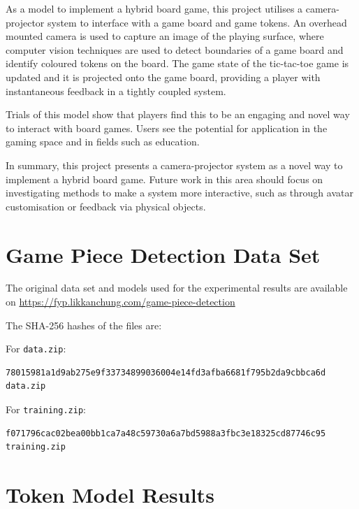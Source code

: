 \documentclass[12pt]{article}
\begin{document}
As a model to implement a hybrid board game, this project utilises a camera-projector system to interface with a game board and game tokens. 
An overhead mounted camera is used to capture an image of the playing surface, where computer vision techniques are used to detect boundaries of a game board and identify coloured tokens on the board. 
The game state of the tic-tac-toe game is updated and it is projected onto the game board, providing a player with instantaneous feedback in a tightly coupled system.

Trials of this model show that players find this to be an engaging and novel way to interact with board games. 
Users see the potential for application in the gaming space and in fields such as education. 

In summary, this project presents a camera-projector system as a novel way to implement a hybrid board game. 
Future work in this area should focus on investigating methods to make a system more interactive, such as through avatar customisation or feedback via physical objects.


\appendix
\section{Game Piece Detection Data Set}
\label{app:data}
\noindent
The original data set and models used for the experimental results are available on 
\url{https://fyp.likkanchung.com/game-piece-detection}

\vspace{2em}
\noindent
The SHA-256 hashes of the files are:

\noindent
For \texttt{data.zip}:
\begin{verbatim}
78015981a1d9ab275e9f33734899036004e14fd3afba6681f795b2da9cbbca6d  
data.zip
\end{verbatim}

\noindent
For \texttt{training.zip}:
\begin{verbatim}
f071796cac02bea00bb1ca7a48c59730a6a7bd5988a3fbc3e18325cd87746c95  
training.zip
\end{verbatim}

\section{Token Model Results}
\label{app:tokens}
\end{document}
